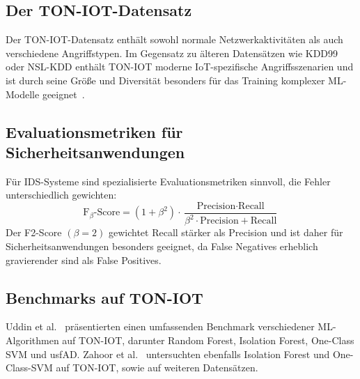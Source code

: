 \documentclass[12pt,oneside]{article}
\begin{document}
	\subsection{Der TON-IOT-Datensatz}
	Der TON-IOT-Datensatz enthält sowohl normale Netzwerkaktivitäten als auch verschiedene Angriffstypen. Im Gegensatz zu älteren Datensätzen wie KDD99 oder NSL-KDD enthält TON-IOT moderne IoT-spezifische Angriffsszenarien und ist durch seine Größe und Diversität besonders für das Training komplexer ML-Modelle geeignet~\cite{moustafa2021}.
	\subsection{Evaluationsmetriken für Sicherheitsanwendungen}
	Für IDS-Systeme sind spezialisierte Evaluationsmetriken sinnvoll, die Fehler unterschiedlich gewichten:
	\begin{equation}
		\text{F}_\beta\text{-Score} = (1 + \beta^2) \cdot \frac{\text{Precision} \cdot \text{Recall}}{\beta^2 \cdot \text{Precision} + \text{Recall}}
	\end{equation}
	Der F2-Score $(\beta = 2)$ gewichtet Recall stärker als Precision und ist daher für Sicherheitsanwendungen besonders geeignet, da False Negatives erheblich gravierender sind als False Positives.
	
	\subsection{Benchmarks auf TON-IOT}
	Uddin et al.~\cite{uddin2024} präsentierten einen umfassenden Benchmark verschiedener \linebreak ML-Algorithmen auf TON-IOT, darunter Random Forest, Isolation Forest, One-Class SVM und usfAD. 
	Zahoor et al.~\cite{zahoor2025} untersuchten ebenfalls Isolation Forest und One-Class-SVM auf TON-IOT, sowie auf weiteren Datensätzen.
	
\end{document}
